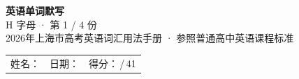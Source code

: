 \documentclass[10pt,a4paper]{article}
\begin{document}
\pagestyle{plain}

\begin{center}
{\LARGE\bfseries 英语单词默写}\\[0.22em]
{\large H 字母 · 第 1 / 4 份}\\[0.18em]
{\small 2026年上海市高考英语词汇用法手册 · 参照普通高中英语课程标准}
\end{center}

\vspace{0.25em}
\noindent\begin{tabular}{@{}p{}@{}p{}@{}p{}@{}}
姓名：\underline{\hspace{2.0cm}} & 日期：\underline{\hspace{2.0cm}} & 得分：\underline{\hspace{1.3cm}}\,/\,41 \\
\end{tabular}

\vspace{0.3em}

\vspace{0.08em}
\end{document}
